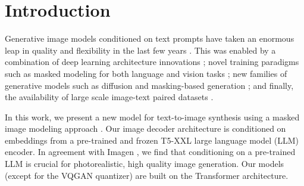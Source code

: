 \section{Introduction}


Generative image models conditioned on text prompts have taken an enormous leap in quality and flexibility in the last few years \citep{dalle2,glide,imagen,parti,ldm,midjourney}. This was enabled by a combination of deep learning architecture innovations \citep{vqvae,vaswani2017attention}; novel training paradigms such as masked modeling for both language \citep{bert,t5xxl} and vision tasks \citep{MAE,maskgit}; new families of generative models such as diffusion \citep{ddpm,ldm,imagen} and masking-based generation \citep{maskgit}; and finally, the availability of large scale image-text paired datasets \citep{laion}. 



In this work, we present a new model for text-to-image synthesis using a masked image modeling approach \citep{maskgit}. Our image decoder architecture is conditioned on embeddings from a pre-trained and frozen T5-XXL \citep{t5xxl} large language model (LLM) encoder. In agreement with Imagen \citep{imagen}, we find that conditioning on a pre-trained LLM is crucial for photorealistic, high quality image generation. Our models (except for the VQGAN quantizer) are built on the Transformer \citep{vaswani2017attention} architecture. 

